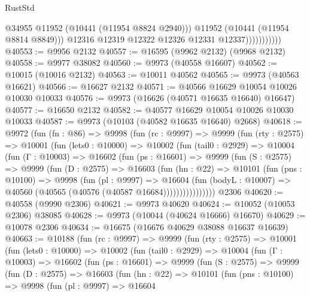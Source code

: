 \begin{lexlean}{RustStd}
\begin{coremodule}
                              @34955
                              @11952
                              (@10441 (@11954 @8824 @2940)))
                            @11952
                            (@10441 (@11954 @8814 @8849)))
                          @12316
                          @12319
                          @12322
                          @12326
                          @12331
                          @12337)))))))))))
@40553 := @9956 @2132
@40557 := @16595 (@9962 @2132) (@9968 @2132)
@40558 := @9977 @38082
@40560 := @9973 (@40558 @16607)
@40562 := @10015 (@10016 @2132)
@40563 := @10011 @40562
@40565 := @9973 (@40563 @16621)
@40566 := @16627 @2132
@40571 := @40566 @16629 @10054 @10026 @10030 @10033
@40576 := @9973 (@16626 (@40571 @16635 @16640) @16647)
@40577 := @16650 @2132
@40582 := @40577 @16629 @10054 @10026 @10030 @10033
@40587 := @9973 (@10103 (@40582 @16635 @16640) @2668)
@40618 := @9972
    (fun (fn : @86) =>
    @9998
      (fun (rc : @9997) =>
      @9999
        (fun (rty : @2575) =>
        @10001
          (fun (lets0 : @10000) =>
          @10002
            (fun (tail0 : @2929) =>
            @10004
              (fun (Γ : @10003) =>
              @16602
                (fun (ps : @16601) =>
                @9999
                  (fun (S : @2575) =>
                  @9999
                    (fun (D : @2575) =>
                    @16603
                      (fun (hn : @22) =>
                      @10101
                        (fun (pns : @10100) =>
                        @9998
                          (fun (pl : @9997) =>
                          @16604
                            (fun (bodyL : @10007) =>
                            @40560 (@40565 (@40576 (@40587 @16684))))))))))))))))
    @2306
@40620 := @40558 (@9990 @2306)
@40621 := @9973 @40620
@40624 := @10052 (@10053 @2306) @38085
@40628 := @9973 (@10044 (@40624 @16666) @16670)
@40629 := @10078 @2306
@40634 := @16675 (@16676 @40629 @38088 @16637 @16639)
@40663 := @10188
    (fun (rc : @9997) =>
    @9999
      (fun (rty : @2575) =>
      @10001
        (fun (lets0 : @10000) =>
        @10002
          (fun (tail0 : @2929) =>
          @10004
            (fun (Γ : @10003) =>
            @16602
              (fun (ps : @16601) =>
              @9999
                (fun (S : @2575) =>
                @9999
                  (fun (D : @2575) =>
                  @16603
                    (fun (hn : @22) =>
                    @10101
                      (fun (pns : @10100) =>
                      @9998
                        (fun (pl : @9997) =>
                        @16604

\end{coremodule}
\end{lexlean}
